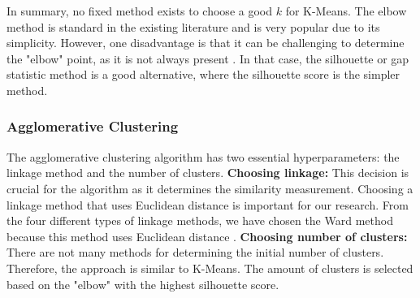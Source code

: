 In summary, no fixed method exists to choose a good $k$ for K-Means.
The elbow method is standard in the existing literature and is very popular due to its simplicity.
However, one disadvantage is that it can be challenging to determine the "elbow" point, as it is not always present \citep{kodinariya_review_2013}.
In that case, the silhouette or gap statistic method is a good alternative, where the silhouette score is the simpler method.
\subsubsection{Agglomerative Clustering} \label{theory:clustering-agglomerative}
The agglomerative clustering algorithm has two essential hyperparameters: the linkage method and the number of clusters. \newline
\textbf{Choosing linkage:}
This decision is crucial for the algorithm as it determines the similarity measurement.
Choosing a linkage method that uses Euclidean distance is important for our research.
From the four different types of linkage methods, we have chosen the Ward method because this method uses Euclidean distance \citep{roux_comparative_2015,seetharaman_brief_2019}.
\textbf{Choosing number of clusters:}
There are not many methods for determining the initial number of clusters.
Therefore, the approach is similar to K-Means.
The amount of clusters is selected based on the "elbow" with the highest silhouette score.

